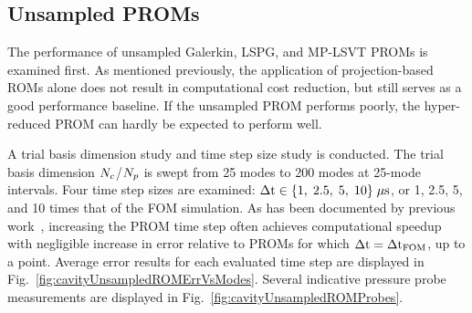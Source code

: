 \subsection{Unsampled PROMs}

The performance of unsampled Galerkin, LSPG, and MP-LSVT PROMs is examined first. As mentioned previously, the application of projection-based ROMs alone does not result in computational cost reduction, but still serves as a good performance baseline. If the unsampled PROM performs poorly, the hyper-reduced PROM can hardly be expected to perform well.

A trial basis dimension study and time step size study is conducted. The trial basis dimension $N_c$/$N_p$ is swept from 25 modes to 200 modes at 25-mode intervals. Four time step sizes are examined: $\Delta \text{t} \in \{ 1, \; 2.5, \; 5, \; 10 \} \; \mu \text{s}$, or 1, 2.5, 5, and 10 times that of the FOM simulation. As has been documented by previous work~\cite{Carlberg2017,Huang2022,Wentland2021}, increasing the PROM time step often achieves computational speedup with negligible increase in error relative to PROMs for which $\Delta \text{t} = \Delta \text{t}_{\text{FOM}}$, up to a point. Average error results for each evaluated time step are displayed in Fig.~\ref{fig:cavityUnsampledROMErrVsModes}. Several indicative pressure probe measurements are displayed in Fig.~\ref{fig:cavityUnsampledROMProbes}.

